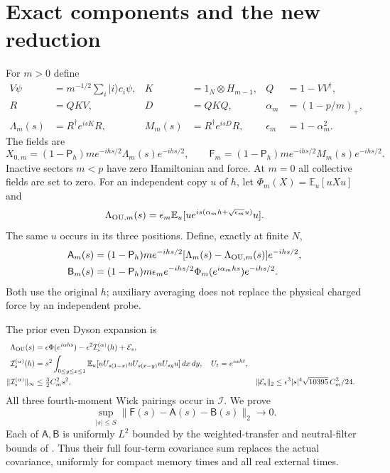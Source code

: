 \documentclass[11pt,a4paper]{article}
\newcommand{\EE}{\mathbb E}
\newcommand{\PP}{\mathsf P_h}
\newcommand{\MA}{\mathsf A}
\newcommand{\BB}{\mathsf B}
\newcommand{\FF}{\mathsf F}
\begin{document}
\section{Exact components and the new reduction}
For $m>0$ define
\begin{align}
 V\psi&=m^{-1/2}\sum_i|i\rangle c_i\psi,&
 K&=1_N\otimes H_{m-1},&Q&=1-VV^\dagger,\\
 R&=QKV,&D&=QKQ,&\alpha_m&=(1-p/m)_+,\\
 \Lambda_m(s)&=R^\dagger e^{isK}R,&
 M_m(s)&=R^\dagger e^{isD}R,&\epsilon_m&=1-\alpha_m^2.
\end{align}
The fields are
\begin{equation}
 X_{0,m}=(1-\PP)m e^{-ihs/2}\Lambda_m(s)e^{-ihs/2},\qquad
 \FF_m=(1-\PP)m e^{-ihs/2}M_m(s)e^{-ihs/2}.
\end{equation}
Inactive sectors $m<p$ have zero Hamiltonian and force. At $m=0$
all collective fields are set to zero.
For an independent copy $u$ of $h$, let $\Phi_m(X)=\EE_u[uXu]$ and
\begin{equation}
 \Lambda_{{\rm OU},m}(s)
 =\epsilon_m\EE_u[u e^{is(\alpha_mh+\sqrt{\epsilon_m}u)}u].
\end{equation}
The same $u$ occurs in its three positions. Define, exactly at finite $N$,
\begin{align}
 \MA_m(s)&=(1-\PP)m e^{-ihs/2}
          [\Lambda_m(s)-\Lambda_{{\rm OU},m}(s)]e^{-ihs/2},\\
 \BB_m(s)&=(1-\PP)m\epsilon_m e^{-ihs/2}
          \Phi_m(e^{i\alpha_mhs})e^{-ihs/2}.
\end{align}
Both use the original $h$; auxiliary averaging does not replace
the physical charged force by an independent probe.

The prior even Dyson expansion is
\begin{align}
 \Lambda_{\rm OU}(s)&=\epsilon\Phi(e^{i\alpha hs})
       -\epsilon^2\mathcal I_s^{(\alpha)}(h)+\mathcal E_s,\\
 \mathcal I_s^{(\alpha)}(h)&=s^2\int_{0\le y\le x\le1}
 \EE_u[uU_{s(1-x)}uU_{s(x-y)}uU_{sy}u]\,dx\,dy,
 \quad U_t=e^{i\alpha ht},\\
 \|\mathcal I_s^{(\alpha)}\|_\infty&\le\tfrac32 C_m^2s^2,
 &\|\mathcal E_s\|_2&\le
 \epsilon^3|s|^4\sqrt{10395}\,C_m^3/24.
\end{align}
All three fourth-moment Wick pairings occur in $\mathcal I$.
We prove
\begin{equation}
 \boxed{\quad\sup_{|s|\le S}\|\FF(s)-\MA(s)-\BB(s)\|_2\to0.\quad}
 \label{eq:reduction}
\end{equation}
Each of $\MA,\BB$ is uniformly $L^2$ bounded by the weighted-transfer
and neutral-filter bounds of \cite{Uniform}. Thus their full
four-term covariance sum replaces the actual covariance, uniformly
for compact memory times and all real external times.
\end{document}
